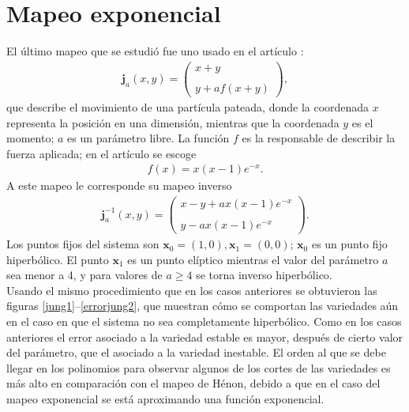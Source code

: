 \label{jung-seccion}\section{Mapeo exponencial}
El último mapeo que se estudió fue uno usado en el artículo \citep{Jung}: 
\begin{eqnarray}
\mathbf{j}_{a}(x,y)=\left(\begin{array}{lcc}
             x+y\\
             \\ y+af(x+y)
             \end{array}\right),
\label{Jung}
\end{eqnarray}
que describe el movimiento de una partícula pateada, donde la coordenada $x$ representa la posición en una dimensión, mientras que la coordenada $y$ es el momento; $a$ es un parámetro libre. La función $f$ es la responsable de describir la fuerza aplicada; en el artículo \cite{Jung} se escoge
\begin{eqnarray*}
f(x)=x(x-1)e^{-x}.
\end{eqnarray*}
A este mapeo le corresponde su mapeo inverso
\begin{eqnarray}
\mathbf{j}^{-1}_{a}(x,y)=\left(\begin{array}{lcc}
             x-y+ax(x-1)e^{-x}\\
             \\ y-ax(x-1)e^{-x}
             \end{array}\right).
             \label{jungI}
\end{eqnarray}
Los puntos fijos del sistema son $\mathbf{x}_{0}=(1,0), \mathbf{x}_{1}=(0,0)$; $\mathbf{x}_{0}$ es un punto fijo hiperbólico. El punto $\mathbf{x}_{1}$ es un punto elíptico mientras el valor del parámetro $a$ sea menor a 4, y para valores de $a \geq 4$ se torna inverso hiperbólico.\\

Usando el mismo procedimiento que en los casos anteriores se obtuvieron las figuras \ref{jung1}--\ref{errorjung2}, que muestran cómo se comportan las variedades aún en el caso en que el sistema no sea completamente hiperbólico. Como en los casos anteriores el error asociado a la variedad estable es mayor, después de cierto valor del parámetro, que el asociado a la variedad inestable. El orden al que se debe llegar en los polinomios para observar algunos de los cortes de las variedades es más alto en comparación con el mapeo de Hénon, debido a que en el caso del mapeo exponencial se está aproximando una función exponencial.

